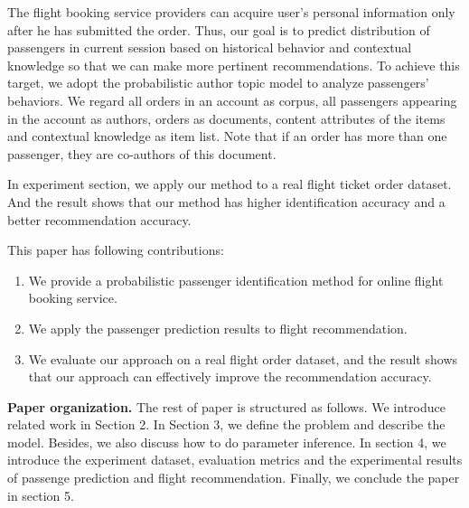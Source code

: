 \documentclass{sig-alternate-05-2015}
\begin{document}
The flight booking service providers can acquire user's personal information only after he has submitted the order. Thus, our goal is to predict distribution of passengers in current session based on historical behavior and contextual knowledge so that we can make more pertinent recommendations. To achieve this target, we adopt the probabilistic author topic model to analyze passengers' behaviors. We regard all orders in an account as corpus, all passengers appearing in the account as authors, orders as documents, content attributes of the items and contextual knowledge as item list. Note that if an order has more than one passenger, they are co-authors of this document.\par
In experiment section, we apply our method to a real flight ticket order dataset.  And the result shows that our method has higher identification accuracy and a better recommendation accuracy.\par
This paper has following contributions:\\
\begin{enumerate}
\item We provide a probabilistic passenger identification method for online flight booking service.
\item We apply the passenger prediction results to flight recommendation.
\item We evaluate our approach on a real flight order dataset, and the result shows that our approach can effectively improve the recommendation accuracy.
\end{enumerate}
\textbf{Paper organization.} The rest of paper is structured as follows. We introduce related work in Section 2. In Section 3, we define the problem and describe the model. Besides, we also discuss how to do parameter inference. In section 4, we introduce the experiment dataset, evaluation metrics and the experimental results of passenge prediction and flight recommendation. Finally, we conclude the paper in section 5.
\end{document}
